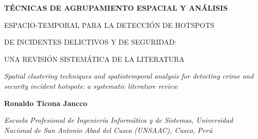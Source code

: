\documentclass[10pt,twoside]{article}
\begin{document}
\thispagestyle{fancy}
\vspace*{0.1cm}
\colorbox{ReviewMaroon}{%
\parbox{\dimexpr\textwidth-2\fboxsep\relax}{%
\centering
\vspace{0.35cm}
{\color{white}\bfseries\Large TÉCNICAS DE AGRUPAMIENTO ESPACIAL Y ANÁLISIS\par
\vspace{0.1cm}
ESPACIO-TEMPORAL PARA LA DETECCIÓN DE HOTSPOTS\par
\vspace{0.1cm}
DE INCIDENTES DELICTIVOS Y DE SEGURIDAD:\par
\vspace{0.1cm}
UNA REVISIÓN SISTEMÁTICA DE LA LITERATURA\par}
\vspace{0.35cm}
}}

\vspace{0.35cm}
\begin{center}
\small\textit{Spatial clustering techniques and spatiotemporal analysis for detecting crime and security incident hotspots: a systematic literature review}
\end{center}

\vspace{0.2cm}
\begin{center}
\small
\textbf{Ronaldo Ticona Jancco}\par
\textit{Escuela Profesional de Ingeniería Informática y de Sistemas, Universidad Nacional de San Antonio Abad del Cusco (UNSAAC), Cusco, Perú}
\end{center}
\end{document}
